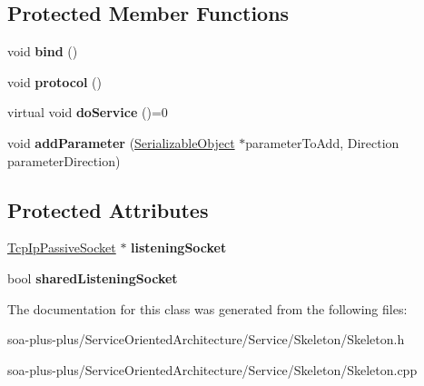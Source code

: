 \subsection*{Protected Member Functions}
\begin{DoxyCompactItemize}
\item 
\hypertarget{class_skeleton_a51c8c7996f2f50a7d5bc85118d52f2b0}{
void {\bfseries bind} ()}
\label{class_skeleton_a51c8c7996f2f50a7d5bc85118d52f2b0}

\item 
\hypertarget{class_skeleton_aaa30ab743dfcd9c6dfcdb7cdbe1088ec}{
void {\bfseries protocol} ()}
\label{class_skeleton_aaa30ab743dfcd9c6dfcdb7cdbe1088ec}

\item 
\hypertarget{class_skeleton_abdafb95c2aacd31d8f4c3b009080129f}{
virtual void {\bfseries doService} ()=0}
\label{class_skeleton_abdafb95c2aacd31d8f4c3b009080129f}

\item 
\hypertarget{class_skeleton_acb875d125918849c652b6f8fe0fb5eea}{
void {\bfseries addParameter} (\hyperlink{class_serializable_object}{SerializableObject} $\ast$parameterToAdd, Direction parameterDirection)}
\label{class_skeleton_acb875d125918849c652b6f8fe0fb5eea}

\end{DoxyCompactItemize}
\subsection*{Protected Attributes}
\begin{DoxyCompactItemize}
\item 
\hypertarget{class_skeleton_a5000048b11afd3950929444979627e14}{
\hyperlink{class_tcp_ip_passive_socket}{TcpIpPassiveSocket} $\ast$ {\bfseries listeningSocket}}
\label{class_skeleton_a5000048b11afd3950929444979627e14}

\item 
\hypertarget{class_skeleton_adc7f1757aa86603d94d7bd8b83eec4db}{
bool {\bfseries sharedListeningSocket}}
\label{class_skeleton_adc7f1757aa86603d94d7bd8b83eec4db}

\end{DoxyCompactItemize}


The documentation for this class was generated from the following files:\begin{DoxyCompactItemize}
\item 
soa-\/plus-\/plus/ServiceOrientedArchitecture/Service/Skeleton/Skeleton.h\item 
soa-\/plus-\/plus/ServiceOrientedArchitecture/Service/Skeleton/Skeleton.cpp\end{DoxyCompactItemize}
